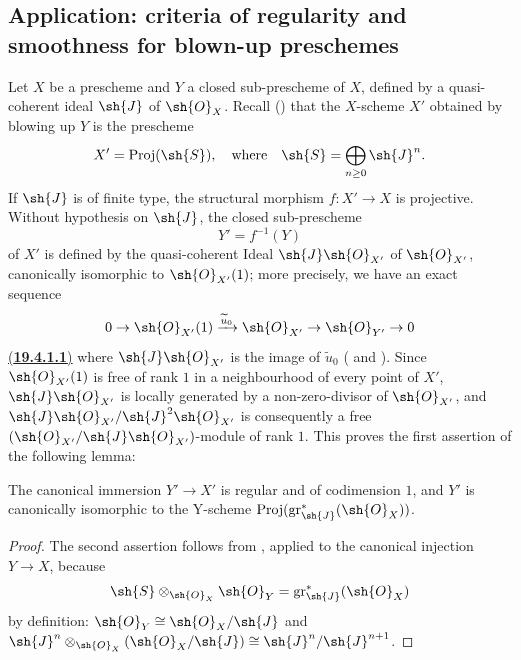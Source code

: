 \subsection{Application: criteria of regularity and smoothness for blown-up preschemes}
\label{subsection:IV.19.4}


\begin{env}[19.4.1]
\label{IV.19.4.1}
Let $X$ be a prescheme and $Y$ a closed sub-prescheme of $X$, defined by a quasi-coherent ideal $\sh{J}$ of $\sh{O}_X$.
Recall () that the $X$-scheme $X'$ obtained by blowing up $Y$ is the prescheme
\[
  X'=\operatorname{Proj}(\sh{S}), \quad \text{where}\quad \sh{S}=\bigoplus_{n\geq 0}\sh{J}^n.
\]
If $\sh{J}$ is of finite type, the structural morphism $f:X'\to X$ is projective.
Without hypothesis on $\sh{J}$, the closed sub-prescheme
\[
  Y'=f^{-1}(Y)
\]
of $X'$ is defined by the quasi-coherent Ideal $\sh{J}\sh{O}_{X'}$ of $\sh{O}_{X'}$, canonically isomorphic to $\sh{O}_{X'}(1)$; more precisely, we have an exact sequence
\[
  0\to\sh{O}_{X'}(1)\xrightarrow{\widetilde{u}_0}\sh{O}_{X'}\to\sh{O}_{Y'}\to 0
\]
{\hyperlink{ega4.c04.subsec.19-4-1-1}{(\textbf{19.4.1.1})}}
\label{IV.19.4.1.1}
where $\sh{J}\sh{O}_{X'}$ is the image of $\widetilde{u}_0$ ( and ).
Since $\sh{O}_{X'}(1)$ is free of rank $1$ in a neighbourhood of every point of $X'$, $\sh{J}\sh{O}_{X'}$ is locally generated by a non-zero-divisor of $\sh{O}_{X'}$, and $\sh{J}\sh{O}_{X'}/\sh{J}^2\sh{O}_{X'}$ is consequently a free $(\sh{O}_{X'}/\sh{J}\sh{O}_{X'})$-module of rank $1$.
This proves the first assertion of the following lemma:
\end{env}

\begin{lemma}[19.4.2]
\label{IV.19.4.2}
The canonical immersion $Y'\to X'$ is regular and of codimension $1$, and $Y'$ is canonically isomorphic to the Y-scheme $\operatorname{Proj}(\operatorname{gr}_\sh{J}^*(\sh{O}_X))$.
\end{lemma}

\begin{proof}
The second assertion follows from , applied to the canonical injection $Y\to X$, because
\[
  \sh{S}\otimes_{\sh{O}_X}\sh{O}_Y=\operatorname{gr}_{\sh{J}}^*(\sh{O}_X)
\]
by definition: $\sh{O}_Y\cong\sh{O}_X/\sh{J}$ and $\sh{J}^n\otimes_{\sh{O}_X}(\sh{O}_X/\sh{J})\cong\sh{J}^n/\sh{J}^{n+1}$.
\end{proof}

